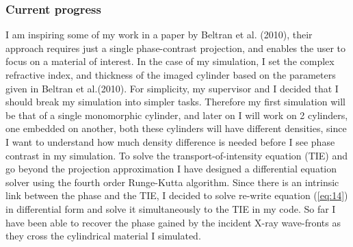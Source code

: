 \documentclass[9pt, a4paper]{article}
\begin{document}
\subsubsection{Current progress}
I am inspiring some of my work in a paper by Beltran et al. (2010), their approach requires just a single phase-contrast projection, and enables the user to focus on a material of interest. In the case of my simulation, I set the complex refractive index, and thickness of the imaged cylinder based on the parameters given in Beltran et al.(2010)\cite{CH49}. For simplicity, my supervisor and I decided that I should break my simulation into simpler tasks. Therefore my first simulation will be that of a single monomorphic cylinder, and later on I will work on 2 cylinders, one embedded on another, both these cylinders will have different densities, since I want to understand how much density difference is needed before I see phase contrast in my simulation.
To solve the transport-of-intensity equation (TIE) and go beyond the projection approximation I have designed a differential equation solver using the fourth order Runge-Kutta algorithm. Since there is an intrinsic link between the phase and the TIE, I decided to solve re-write equation (\ref{eq:14}) in differential form and solve it simultaneously to the TIE in my code.
So far I have been able to recover the phase gained by the incident X-ray wave-fronts as they cross the cylindrical material I simulated.
\end{document}
